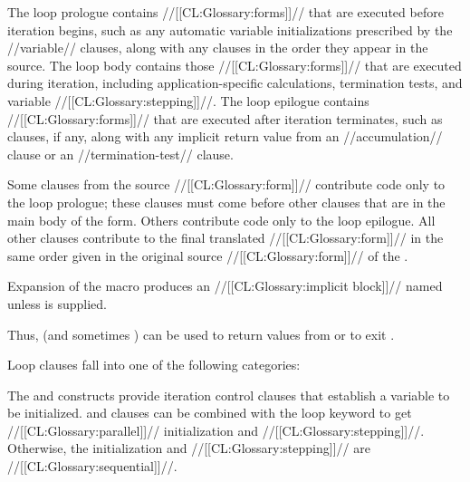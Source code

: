 \beginlist {}
  The loop prologue contains //[[CL:Glossary:forms]]//  that are executed before iteration begins, such as any automatic variable initializations prescribed  by the //variable// clauses, along with any  clauses in the order they appear in the source.
  The loop body contains those //[[CL:Glossary:forms]]// that are executed during iteration,  including application-specific calculations, termination tests, and variable //[[CL:Glossary:stepping]]//.
  The loop epilogue contains //[[CL:Glossary:forms]]// that are executed after iteration  terminates, such as  clauses, if any, along with any implicit return value from an //accumulation// clause or an //termination-test// clause.

\endlist
 

Some clauses from the source //[[CL:Glossary:form]]// contribute code only to the loop prologue; these clauses must
  come before other clauses that are in the main body of the  form.            
  Others contribute code only to the loop epilogue.
  All other clauses contribute to the final  translated //[[CL:Glossary:form]]// in the same 
  order given in the original source //[[CL:Glossary:form]]// of the .

Expansion of the  macro produces an //[[CL:Glossary:implicit block]]// named \nil\   unless  is supplied.

Thus,  (and sometimes ) can be used to return values from  or to exit .

\endsubsubsection%

 

Loop clauses fall into one of the following categories:

The  and  constructs provide iteration control clauses that establish a variable to be initialized.  and  clauses can be combined with the loop keyword  to get //[[CL:Glossary:parallel]]// initialization and //[[CL:Glossary:stepping]]//. Otherwise, the initialization and //[[CL:Glossary:stepping]]// are //[[CL:Glossary:sequential]]//.

